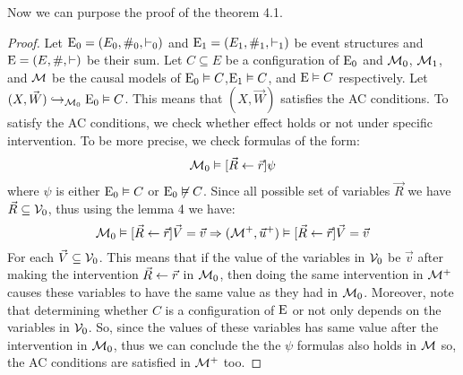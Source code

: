 Now we can purpose the proof of the theorem 4.1.
\begin{proof}
    Let $\mathrm{E}_0 = (E_0,\#_0,\vdash_0)$ and $\mathrm{E}_1 = (E_1,\#_1,\vdash_1)$ be event
    structures and $\mathrm{E} = (E,\#,\vdash)$ be their sum.
    Let $C \subseteq E$ be a configuration of $\mathrm{E}_0$
    and $\mathcal{M}_0$, $\mathcal{M}_1$, and $\mathcal{M}$ be the causal models
    of $\mathrm{E}_0 \vDash C$,$\mathrm{E}_1 \vDash C$, and $\mathrm{E} \vDash C$ respectively.
    Let $(X,\vec W) \hookrightarrow_{\mathcal{M}_0} \mathrm{E}_0 \vDash C$.
    This means that $(X,\vec W)$ satisfies the AC conditions.
    To satisfy the AC conditions, we check whether effect holds or not
    under specific intervention.
    To be more precise, we check formulas of the form:
    \begin{equation*}
        \mathcal{M}_0\vDash[\vec R \leftarrow \vec r] \psi
    \end{equation*}
    where $\psi$ is either $\mathrm{E}_0 \vDash C$ or $\mathrm{E}_0 \not \vDash C$.
    Since all possible set of variables $\vec R$ we have
    $\vec R \subseteq \mathcal{V}_0$, thus using the lemma 4 we have:
    \begin{equation*}
        \mathcal{M}_0\vDash[\vec R \leftarrow \vec r] \vec V = \vec v
        \Rightarrow
        (\mathcal{M}^+,\vec u^+)\vDash[\vec R \leftarrow \vec r] \vec V = \vec v
    \end{equation*}
    For each $\vec V \subseteq \mathcal{V}_0$.
    This means that if the value of the variables in $\mathcal{V}_0$ be $\vec v$
    after making the intervention $\vec R \leftarrow \vec r$ in $\mathcal{M}_0$,
    then doing the same intervention in $\mathcal{M}^+$ causes these variables to
    have the same value as they had in $\mathcal{M}_0$.
    Moreover, note that determining whether $C$ is a configuration of
    $\mathrm{E}$ or not only depends on the variables in $\mathcal{V}_0$.
    So, since the values of these variables has same value after
    the intervention in $\mathcal{M}_0$, thus we can conclude the
    the $\psi$ formulas also holds in $\mathcal{M}$ so, the AC conditions
    are satisfied in $\mathcal{M}^+$ too.
\end{proof}